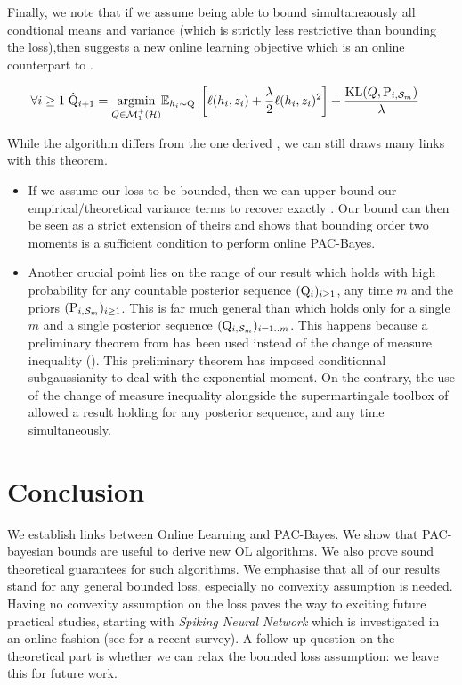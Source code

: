 Finally, we note that if we assume being able to bound simultaneaously all condtional means and variance (which is strictly less restrictive than bounding the loss),then   suggests a new online learning objective which is an online counterpart to .

\begin{align}
    \forall i\geq1\; \hat{\mathrm{Q}}_{i+1}&= \underset{Q\in\mathcal{M}^+_1(\mathcal{H})}{\mathrm{argmin}} \mathbb{E}_{h_i\sim \mathrm{Q}} \; \left[\ell(h_i,z_i)+ \frac{\lambda}{2}\ell(h_i,z_i)^2\right] + \frac{\operatorname{KL}(Q, \mathrm{P}_{i,\mathcal{S}_m})}{\lambda}
\end{align}

While the algorithm differs from the one derived , we can still draws many links with this theorem.

\begin{itemize}
  \item If we assume our loss to be bounded, then we can upper bound our empirical/theoretical variance terms to recover exactly . Our bound can then be seen as a strict extension of theirs and shows that bounding order two moments is a sufficient condition to perform online PAC-Bayes.
  \item Another crucial point lies on the range of our result which holds with high probability for any countable posterior sequence $(\mathrm{Q}_{i})_{i\geq 1}$, any time $m$ and the priors $(\mathrm{P}_{i,\mathcal{S}_m})_{i\geq 1}$.
  This is far much general than  which holds only for a single $m$ and a single posterior sequence $(\mathrm{Q}_{i,\mathcal{S}_m})_{i=1..m}$. This happens because a preliminary theorem from \citet{rivasplata2020pac} has been used instead of the change of measure inequality (). This preliminary theorem has imposed conditionnal subgaussianity to deal with the exponential moment. On the contrary, the use of the change of measure inequality alongside the supermartingale toolbox of  allowed a result holding for any posterior sequence, and any time simultaneously.
\end{itemize}






 \section{Conclusion}

We establish links between Online Learning and PAC-Bayes. We show that PAC-bayesian bounds are useful to derive new OL algorithms. We also prove sound theoretical guarantees for such algorithms. We emphasise that all of our results stand for any general bounded loss, especially no convexity assumption is needed.
Having no convexity assumption on the loss paves the way to exciting future practical studies, starting with \emph{Spiking Neural Network} which is investigated in an online fashion (see \citealp{lobo2020spiking} for a recent survey). A follow-up question on the theoretical part is whether we can relax the bounded loss assumption: we leave this for future work.

